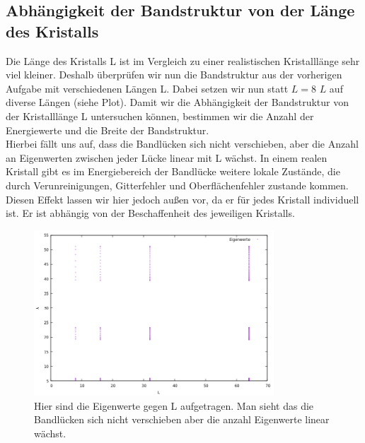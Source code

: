 \documentclass[ngerman]{scrartcl}
\begin{document}
\subsection{Abhängigkeit der Bandstruktur von der Länge des Kristalls}
	Die Länge des Kristalls L ist im Vergleich zu einer realistischen Kristalllänge sehr viel kleiner.
	Deshalb überprüfen wir nun die Bandstruktur aus der vorherigen Aufgabe mit verschiedenen Längen L.
	Dabei setzen wir nun statt $L=8$ $L$ auf diverse Längen (siehe Plot).
	Damit wir die Abhängigkeit der Bandstruktur von der Kristalllänge L untersuchen können, bestimmen wir die Anzahl der Energiewerte und die Breite der Bandstruktur.\\
	Hierbei fällt uns auf, dass die Bandlücken sich nicht verschieben, aber die Anzahl an Eigenwerten zwischen jeder Lücke linear mit L wächst.
	In einem realen Kristall gibt es im Energiebereich der Bandlücke weitere lokale Zustände, die durch Verunreinigungen, Gitterfehler und Oberflächenfehler zustande kommen.
	Diesen Effekt lassen wir hier jedoch außen vor, da er für jedes Kristall individuell ist.
	Er ist abhängig von der Beschaffenheit des jeweiligen Kristalls. 
	\begin{figure}[htbp]
		\centering
		\includegraphics[width=0.8\textwidth]{code/L_plot.png}
		\caption[$f{ext}$]{
			Hier sind die Eigenwerte gegen L aufgetragen.
			Man sieht das die Bandlücken sich nicht verschieben aber die anzahl Eigenwerte linear wächst.
		}
		\label{fig:8.1}
	\end{figure}
\end{document}
